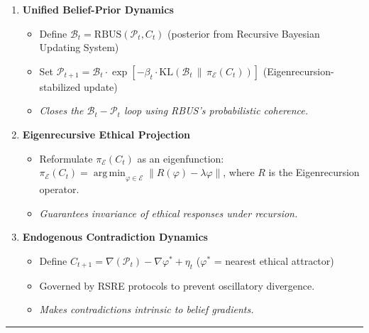 \documentclass[
]{article}
\providecommand{\tightlist}{%
  \setlength{\itemsep}{0pt}\setlength{\parskip}{0pt}}
\DeclareMathOperator*{\argmin}{arg\,min}
\begin{document}
\begin{enumerate}
\def\labelenumi{\arabic{enumi}.}
\tightlist
\item
  \textbf{Unified Belief-Prior Dynamics}

  \begin{itemize}
  \tightlist
  \item
    Define \(\mathcal{B}_t = \mathrm{RBUS}(\mathcal{P}_t, C_t)\)
    (posterior from Recursive Bayesian Updating System)\\
  \item
    Set
    \(\mathcal{P}_{t+1} = \mathcal{B}_t \cdot \exp[-\beta_t \cdot \mathrm{KL}(\mathcal{B}_t \,\|\, \pi_{\mathcal{E}}(C_t))]\)
    (Eigenrecursion-stabilized update)\\
  \item
    \emph{Closes the \(\mathcal{B}_t-\mathcal{P}_t\) loop using RBUS's
    probabilistic coherence.}
  \end{itemize}
\item
  \textbf{Eigenrecursive Ethical Projection}

  \begin{itemize}
  \tightlist
  \item
    Reformulate \(\pi_{\mathcal{E}}(C_t)\) as an eigenfunction:\\
    \(\pi_{\mathcal{E}}(C_t) = \argmin_{\varphi \in \mathcal{E}} \|R(\varphi) - \lambda \varphi\|\),
    where \(R\) is the Eigenrecursion operator.\\
  \item
    \emph{Guarantees invariance of ethical responses under recursion.}
  \end{itemize}
\item
  \textbf{Endogenous Contradiction Dynamics}

  \begin{itemize}
  \tightlist
  \item
    Define
    \(C_{t+1} = \nabla(\mathcal{P}_t) - \nabla\varphi^{*} + \eta_t\)
    (\(\varphi^{*}\) = nearest ethical attractor)\\
  \item
    Governed by RSRE protocols to prevent oscillatory divergence.\\
  \item
    \emph{Makes contradictions intrinsic to belief gradients.}
  \end{itemize}
\end{enumerate}

\begin{center}\rule{0.5\linewidth}{0.5pt}\end{center}
\end{document}

